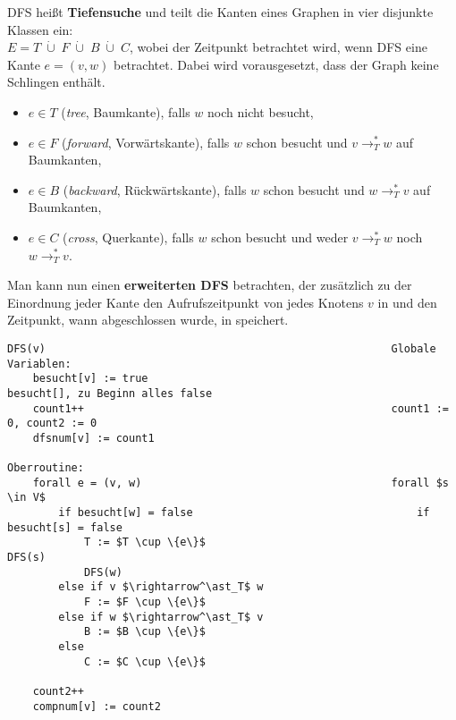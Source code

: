 \linie

DFS heißt \textbf{Tiefensuche} und teilt die Kanten eines Graphen in
vier disjunkte Klassen ein: \\
$E = T \;\dot{\cup}\; F \;\dot{\cup}\; B \;\dot{\cup}\; C$, wobei der
Zeitpunkt betrachtet wird, wenn DFS eine Kante $e = (v, w)$ betrachtet.
Dabei wird vorausgesetzt, dass der Graph keine Schlingen enthält.
\begin{itemize}
    \item $e \in T$ (\emph{tree}, Baumkante), falls $w$ noch nicht besucht,
    \item $e \in F$ (\emph{forward}, Vorwärtskante), falls $w$ schon besucht
    und $v \rightarrow^\ast_T w$ auf Baumkanten,
    \item $e \in B$ (\emph{backward}, Rückwärtskante), falls $w$ schon besucht
    und $w \rightarrow^\ast_T v$ auf Baumkanten,
    \item $e \in C$ (\emph{cross}, Querkante), falls $w$ schon besucht
    und weder $v \rightarrow^\ast_T w$ noch $w \rightarrow^\ast_T v$.
\end{itemize}

\linie

Man kann nun einen \textbf{erweiterten DFS} betrachten, der zusätzlich zu der
Einordnung jeder Kante den Aufrufszeitpunkt von  jedes Knotens
$v$ in  und den Zeitpunkt, wann  abgeschlossen
wurde, in  speichert.

\begin{lstlisting}
DFS(v)                                                      Globale Variablen:
    besucht[v] := true                                       besucht[], zu Beginn alles false
    count1++                                                count1 := 0, count2 := 0
    dfsnum[v] := count1
                                                            Oberroutine:
    forall e = (v, w)                                       forall $s \in V$
        if besucht[w] = false                                   if besucht[s] = false
            T := $T \cup \{e\}$                                                    DFS(s)
            DFS(w)
        else if v $\rightarrow^\ast_T$ w
            F := $F \cup \{e\}$
        else if w $\rightarrow^\ast_T$ v
            B := $B \cup \{e\}$
        else
            C := $C \cup \{e\}$
    
    count2++
    compnum[v] := count2
\end{lstlisting}

\linie
\pagebreak

